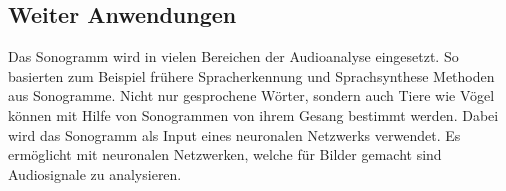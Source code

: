 \subsection{Weiter Anwendungen}
Das Sonogramm wird in vielen Bereichen der Audioanalyse eingesetzt.
So basierten zum Beispiel frühere Spracherkennung und Sprachsynthese Methoden 
aus Sonogramme.
Nicht nur gesprochene Wörter, sondern auch Tiere wie Vögel können mit Hilfe
von Sonogrammen von ihrem Gesang bestimmt werden.
Dabei wird das Sonogramm als Input eines neuronalen Netzwerks verwendet.
Es ermöglicht mit neuronalen Netzwerken, welche für Bilder gemacht sind
Audiosignale zu analysieren.